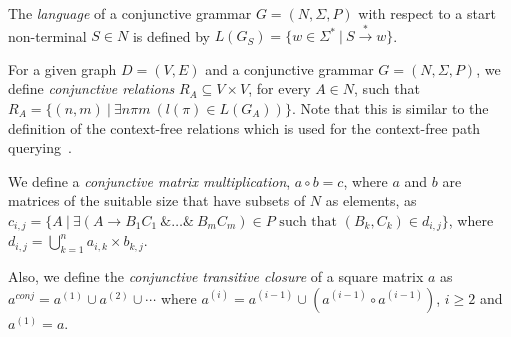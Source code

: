 The \textit{language} of a conjunctive grammar $G = (N,\Sigma,P)$ with respect to a start non-terminal $S \in N$ is defined by $L(G_S) = \{w \in \Sigma^*~|~S \xrightarrow{*} w\}$.

For a given graph $D = (V, E)$ and a conjunctive grammar $G = (N, \Sigma, P)$, we define \textit{conjunctive relations} $R_A \subseteq V \times V$, for every $A \in N$, such that $R_A = \{(n,m)~|~\exists n \pi m~(l(\pi) \in L(G_A))\}$. Note that this is similar to the definition of the context-free relations which is used for the context-free path querying~\cite{hellingsRelational}.

We define a \textit{conjunctive matrix multiplication}, $a \circ b = c$, where $a$ and $b$ are matrices of the suitable size that have subsets of $N$ as elements, as $c_{i,j} = \{A~|~\exists (A \rightarrow B_1 C_1~\& \ldots \&~B_m C_m) \in P \text{ such that } (B_k, C_k) \in d_{i,j} \}$, where $d_{i,j} = \bigcup^{n}_{k=1}{a_{i,k} \times b_{k,j}}$. 

Also, we define the \textit{conjunctive transitive closure} of a square matrix $a$ as $a^{conj} = a^{(1)} \cup a^{(2)} \cup \cdots$ where $a^{(i)} = a^{(i-1)} \cup (a^{(i-1)} \circ a^{(i-1)})$, $i \ge 2$ and $a^{(1)} = a$.

